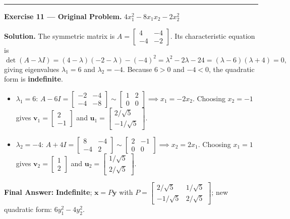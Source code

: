 \documentclass[11pt, letterpaper]{article}
\theoremstyle{definition}
\theoremstyle{remark}
\begin{document}
\medskip
\hrule
\medskip

\textbf{Exercise 11 --- Original Problem.} $4x_1^2 - 8x_1x_2 - 2x_2^2$

\textbf{Solution.}
The symmetric matrix is $A = \begin{bmatrix} 4 & -4 \\ -4 & -2 \end{bmatrix}$. Its characteristic equation is
\[
\det(A - \lambda I) = (4 - \lambda)(-2 - \lambda) - (-4)^2 = \lambda^2 - 2\lambda - 24 = (\lambda - 6)(\lambda + 4) = 0,
\]
giving eigenvalues $\lambda_1 = 6$ and $\lambda_2 = -4$. Because $6 > 0$ and $-4 < 0$, the quadratic form is \textbf{indefinite}.
\begin{itemize}
    \item $\lambda_1 = 6$: $A - 6I = \begin{bmatrix} -2 & -4 \\ -4 & -8 \end{bmatrix} \sim \begin{bmatrix} 1 & 2 \\ 0 & 0 \end{bmatrix} \implies x_1 = -2x_2$. Choosing $x_2 = -1$ gives $\mathbf{v}_1 = \begin{bmatrix} 2 \\ -1 \end{bmatrix}$ and $\mathbf{u}_1 = \begin{bmatrix} 2/\sqrt{5} \\ -1/\sqrt{5} \end{bmatrix}$.
    \item $\lambda_2 = -4$: $A + 4I = \begin{bmatrix} 8 & -4 \\ -4 & 2 \end{bmatrix} \sim \begin{bmatrix} 2 & -1 \\ 0 & 0 \end{bmatrix} \implies x_2 = 2x_1$. Choosing $x_1 = 1$ gives $\mathbf{v}_2 = \begin{bmatrix} 1 \\ 2 \end{bmatrix}$ and $\mathbf{u}_2 = \begin{bmatrix} 1/\sqrt{5} \\ 2/\sqrt{5} \end{bmatrix}$.
\end{itemize}

\textbf{Final Answer:} \textbf{Indefinite}; $\mathbf{x} = P\mathbf{y}$ with $P = \begin{bmatrix} 2/\sqrt{5} & 1/\sqrt{5} \\ -1/\sqrt{5} & 2/\sqrt{5} \end{bmatrix}$; new quadratic form: $6y_1^2 - 4y_2^2$.
\end{document}
